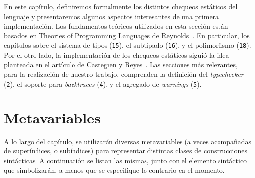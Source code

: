 En este capítulo, definiremos formalmente los distintos chequeos estáticos del lenguaje y presentaremos algunos aspectos interesantes de una primera implementación. Los fundamentos teóricos utilizados en esta sección están basados en Theories of Programming Languages de Reynolds~\cite{Reynolds}.
En particular, los capítulos sobre el sistema de tipos (\texttt{15}), el subtipado (\texttt{16}), y el polimorfismo (\texttt{18}).
Por el otro lado, la implementación de los chequeos estáticos siguió la idea planteada en el artículo de Castegren y Reyes~\cite{MonadicTC}.
Las secciones más relevantes, para la realización de nuestro trabajo, comprenden la definición del \textit{typechecker} (\texttt{2}), el soporte para \textit{backtraces} (\texttt{4}), y el agregado de \textit{warnings} (\texttt{5}).

\section{Metavariables}

A lo largo del capítulo, se utilizarán diversas metavariables (a veces acompañadas de superíndices, o subíndices) para representar distintas clases de construcciones sintácticas.
A continuación se listan las mismas, junto con el elemento sintáctico que simbolizarán, a menos que se especifique lo contrario en el momento.

